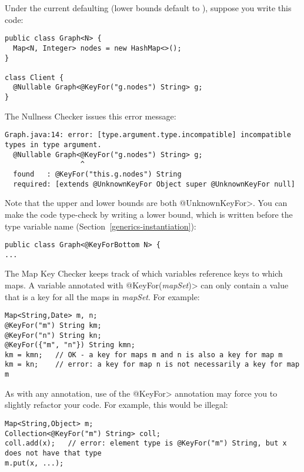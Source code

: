 Under the current defaulting (lower bounds default to
), suppose you write this code:

\begin{Verbatim}
public class Graph<N> {
  Map<N, Integer> nodes = new HashMap<>();
}

class Client {
  @Nullable Graph<@KeyFor("g.nodes") String> g;
}
\end{Verbatim}

\noindent
The Nullness Checker issues this error message:

\begin{Verbatim}
Graph.java:14: error: [type.argument.type.incompatible] incompatible types in type argument.
  @Nullable Graph<@KeyFor("g.nodes") String> g;
                  ^
  found   : @KeyFor("this.g.nodes") String
  required: [extends @UnknownKeyFor Object super @UnknownKeyFor null]
\end{Verbatim}

Note that the upper and lower bounds are both \<@UnknownKeyFor>.  You can
make the code type-check by writing a lower bound, which is written before
the type variable name (Section~\ref{generics-instantiation}):

\begin{Verbatim}
public class Graph<@KeyForBottom N> {
...
\end{Verbatim}



The Map Key Checker keeps track of which variables reference keys to
which maps.  A variable annotated with \<@KeyFor(\emph{mapSet})> can only
contain a value that is a key for all the maps in \emph{mapSet}.  For example:

\begin{verbatim}
Map<String,Date> m, n;
@KeyFor("m") String km;
@KeyFor("n") String kn;
@KeyFor({"m", "n"}) String kmn;
km = kmn;   // OK - a key for maps m and n is also a key for map m
km = kn;    // error: a key for map n is not necessarily a key for map m
\end{verbatim}


As with any annotation, use of the \<@KeyFor> annotation may force you to
slightly refactor your code.  For example, this would be illegal:

\begin{verbatim}
Map<String,Object> m;
Collection<@KeyFor("m") String> coll;
coll.add(x);   // error: element type is @KeyFor("m") String, but x does not have that type
m.put(x, ...);
\end{verbatim}

